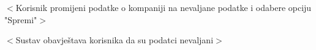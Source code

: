 \begin{packed_item}
\begin{packed_item}
\begin{packed_enum}
							\end{packed_enum}

							\item[5.b] $<$Korisnik promijeni podatke o kompaniji na nevaljane podatke i odabere opciju "Spremi"$>$
							\item[] \begin{packed_enum}

								\item $<$Sustav obavještava korisnika da su podatci nevaljani$>$

							\end{packed_enum}

						\end{packed_item}
					\end{packed_item}

					\noindent {}
